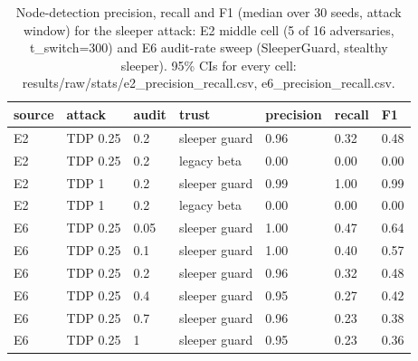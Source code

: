 \begin{table}[t]
\centering\footnotesize\setlength{\tabcolsep}{3pt}
\caption{Node-detection precision, recall and F1 (median over 30 seeds, attack window) for the sleeper attack: E2 middle cell (5 of 16 adversaries, t\_switch=300) and E6 audit-rate sweep (SleeperGuard, stealthy sleeper). 95\% CIs for every cell: results/raw/stats/e2\_precision\_recall.csv, e6\_precision\_recall.csv.}\label{tab:prf}
\begin{tabular}{lllllll}
\toprule
source & attack & audit & trust & precision & recall & F1 \\
\midrule
E2 & TDP 0.25 & 0.2 & sleeper guard & 0.96 & 0.32 & 0.48 \\
E2 & TDP 0.25 & 0.2 & legacy beta & 0.00 & 0.00 & 0.00 \\
E2 & TDP 1 & 0.2 & sleeper guard & 0.99 & 1.00 & 0.99 \\
E2 & TDP 1 & 0.2 & legacy beta & 0.00 & 0.00 & 0.00 \\
E6 & TDP 0.25 & 0.05 & sleeper guard & 1.00 & 0.47 & 0.64 \\
E6 & TDP 0.25 & 0.1 & sleeper guard & 1.00 & 0.40 & 0.57 \\
E6 & TDP 0.25 & 0.2 & sleeper guard & 0.96 & 0.32 & 0.48 \\
E6 & TDP 0.25 & 0.4 & sleeper guard & 0.95 & 0.27 & 0.42 \\
E6 & TDP 0.25 & 0.7 & sleeper guard & 0.96 & 0.23 & 0.38 \\
E6 & TDP 0.25 & 1 & sleeper guard & 0.95 & 0.23 & 0.36 \\
\bottomrule
\end{tabular}

\end{table}
